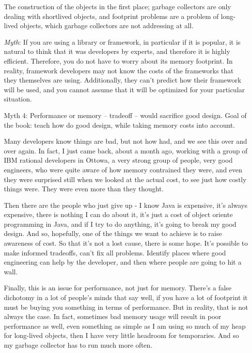 The construction of the objects in the first place; garbage collectors are only dealing with shortlived objects,
 and footprint problems are a problem of long-lived objects, which garbage collectors are not addressing at all.
 

\emph{Myth}: If you are using a library or framework, in particular if
it is popular, it is natural to think that it was developers by experts, and
therefore it is highly efficient. Therefore, you do not have to worry about
its memory footprint. In reality, framework developers may not know
the costs of the frameworks that they themselves are using.  Additionally, they
can't predict how their framework will be used, and you cannot assume that it
will be optimized for your particular situation.


Myth 4: Performance or memory -- tradeoff -- would sacrifice good design.
Goal of the book:  teach how do good design, while taking memory costs into account.

Many developers know things are bad, but not how had, and we see this over and over again. 
In fact, I just came back, about a month ago, working with a group of IBM rational developers in Ottowa, 
a very strong group of people, very good engineers, who were quite aware of how memory contrained they were,
 and even they were surprised still when we looked at the actual cost, to see just how costly things were. 
 They were even more than they thought.

Then there are the people who just give up - I know Java is expensive, it's always expensive, 
there is nothing I can do about it, it's just a cost of object oriente programming in Java, and if I try to do anything, 
it's going to break my good design.
And so, hopefully, one of the things we want to achieve is to raise awareness of cost. 
So that it's not a lost cause, there is some hope.  It's possible to make informed tradeoffs, can't fix all problems. 
Identify places where good engineering can help by the developer, and then where people are going to hit a wall.

Finally, this is an issue for performance, not just for memory. 
There's a false dichotomy in a lot of people's minds that say well, if you have a lot of footprint it must be buying
 you something in terms of performance. But in reality, that is not always the case. In fact, sometimes bad memory usage
  will result in poor performance as well, even something as simple as I am using so much of my heap for long-lived objects, 
  then I have very little headroom for temporaries.  And so my garbage collector has to run much more often. 

